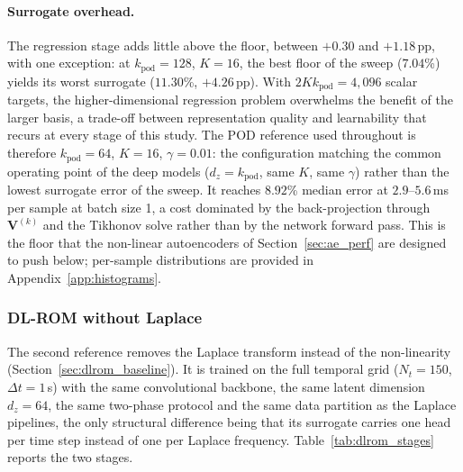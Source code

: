 ﻿\documentclass[a4paper,12pt]{article}
\theoremstyle{definition}
\theoremstyle{remark}
\begin{document}
\paragraph{Surrogate overhead.}
The regression stage adds little above the floor, between $+0.30$ and $+1.18$\,pp, with one exception: at $k_{\mathrm{pod}} = 128$, $K = 16$, the best floor of the sweep ($7.04$\%) yields its worst surrogate ($11.30$\%, $+4.26$\,pp). With $2 K k_{\mathrm{pod}} = 4{,}096$ scalar targets, the higher-dimensional regression problem overwhelms the benefit of the larger basis, a trade-off between representation quality and learnability that recurs at every stage of this study. The POD reference used throughout is therefore $k_{\mathrm{pod}} = 64$, $K = 16$, $\gamma = 0.01$: the configuration matching the common operating point of the deep models ($d_z = k_{\mathrm{pod}}$, same $K$, same $\gamma$) rather than the lowest surrogate error of the sweep. It reaches $8.92$\% median error at $2.9$--$5.6$\,ms per sample at batch size 1, a cost dominated by the back-projection through $\bm{V}^{(k)}$ and the Tikhonov solve rather than by the network forward pass. This is the floor that the non-linear autoencoders of Section~\ref{sec:ae_perf} are designed to push below; per-sample distributions are provided in Appendix~\ref{app:histograms}.

\subsubsection{DL-ROM without Laplace}
\label{sec:dlrom_results}

The second reference removes the Laplace transform instead of the non-linearity (Section~\ref{sec:dlrom_baseline}). It is trained on the full temporal grid ($N_t = 150$, $\Delta t = 1$\,s) with the same convolutional backbone, the same latent dimension $d_z = 64$, the same two-phase protocol and the same data partition as the Laplace pipelines, the only structural difference being that its surrogate carries one head per time step instead of one per Laplace frequency. Table~\ref{tab:dlrom_stages} reports the two stages.
\end{document}
